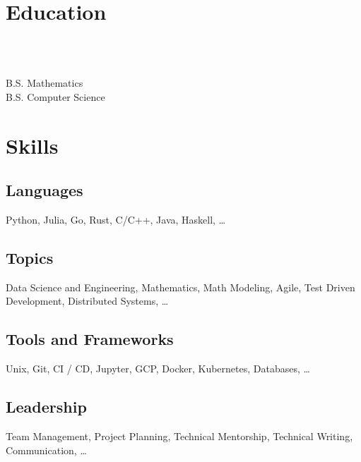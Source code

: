 \documentclass{tc_cv}
\begin{document}

\begin{minipage}[t]{0.3\linewidth}

  \vspace{1.5em}
  \section{Education}
  \\
  \date{Fall 2011 --- Spring 2016}\vspace{0.25em}\\
  \faGraduationCap \hspace{1ex} B.S. Mathematics\\
  \faGraduationCap \hspace{1ex} B.S. Computer Science

  \vspace{1.5em}
  \section{Skills}
  \subsection{Languages}
  Python,
  Julia,
  Go,
  Rust,
  C/C++,
  Java,
  Haskell,
  \ldots

  \vspace{0.25em}
  \subsection{Topics}
  Data Science and Engineering,
  Mathematics,
  Math Modeling,
  Agile,
  Test Driven Development,
  Distributed Systems,
  \ldots

  \vspace{0.25em}
  \subsection{Tools and Frameworks}
  Unix,
  Git,
  CI / CD,
  Jupyter,
  GCP,
  Docker,
  Kubernetes,
  Databases,
  \ldots

  \vspace{0.25em}
  \subsection{Leadership}
  Team Management,
  Project Planning,
  Technical Mentorship,
  Technical Writing,
  Communication,
  \ldots


\end{minipage}
\end{document}
